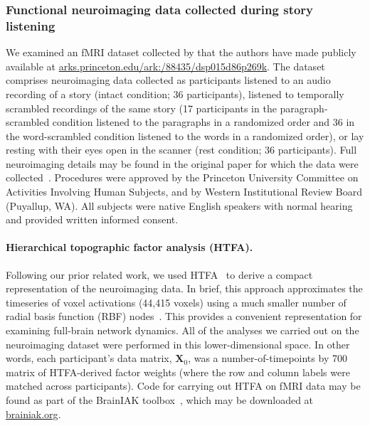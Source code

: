 \documentclass[english]{article}
\begin{document}
 
\subsubsection*{Functional neuroimaging data collected during story
  listening}
We examined an fMRI dataset collected by \cite{SimoEtal16} that the
authors have made publicly available at
\href{http://arks.princeton.edu/ark:/88435/dsp015d86p269k}{arks.princeton.edu/ark:/88435/dsp015d86p269k}.  The dataset
comprises neuroimaging data collected as participants listened
to an audio recording of a story (intact condition; 36 participants),
listened to temporally scrambled recordings of the same story (17
participants in the paragraph-scrambled condition listened to the
paragraphs in a randomized order and 36 in the word-scrambled
condition listened to the words in a randomized order), or lay resting
with their eyes open in the scanner (rest condition; 36
participants).  Full neuroimaging details may be found in the original
paper for which the data were collected~\citep{SimoEtal16}. Procedures were approved by the Princeton University Committee on Activities Involving Human Subjects, and by Western Institutional Review Board (Puyallup, WA). All subjects were native English speakers with normal hearing and provided written informed consent.

\paragraph{Hierarchical topographic factor analysis (HTFA).}
Following our prior related work, we used HTFA~\citep{MannEtal18} to
derive a compact representation of the neuroimaging data.  In brief,
this approach approximates the timeseries of voxel activations (44,415
voxels) using a much smaller number of radial basis function (RBF)
nodes~\citep[in this case, 700 nodes, as determined by an optimization
procedure described by][]{MannEtal18}.  This provides a convenient
representation for examining full-brain network dynamics.  All of the
analyses we carried out on the neuroimaging dataset were performed in
this lower-dimensional space.  In other words, each participant's data
matrix, $\mathbf{X}_0$, was a number-of-timepoints by 700 matrix of
HTFA-derived factor weights (where the row and column labels were
matched across participants).  Code for carrying out HTFA on fMRI data
may be found as part of the BrainIAK toolbox~\citep{CapoEtal17}, which
may be downloaded at \href{https://brainiak.org/}{brainiak.org}.
\end{document}
